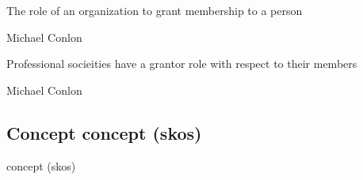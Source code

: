 \documentclass[letterpaper,10pt,english]{sphinxmanual}
\begin{document}
\begin{sphinxShadowBox}

\sphinxAtStartPar
{\hyperref[\detokenize{doc-BFO_0000023::doc}]{}}
\end{sphinxShadowBox}

\begin{sphinxShadowBox}

\sphinxAtStartPar
The role of an organization to grant membership to a person
\end{sphinxShadowBox}

\begin{sphinxShadowBox}

\sphinxAtStartPar
Michael Conlon 
\end{sphinxShadowBox}

\begin{sphinxShadowBox}

\sphinxAtStartPar
Professional socieities have a grantor role with respect to their members
\end{sphinxShadowBox}

\begin{sphinxShadowBox}

\sphinxAtStartPar
Michael Conlon 
\end{sphinxShadowBox}
\begin{quote}

\ignorespaces \end{quote}


\subsection{Concept \sphinxhyphen{} concept (skos)}
\label{\detokenize{doc-Concept:concept-concept-skos}}\label{\detokenize{doc-Concept:index-0}}\label{\detokenize{doc-Concept::doc}}
\begin{sphinxShadowBox}

\sphinxAtStartPar
concept (skos)
\end{sphinxShadowBox}
\end{document}
